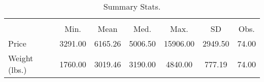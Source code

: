 \begin{table}[htbp]\centering
\def\sym#1{\ifmmode^{#1}\else\(^{#1}\)\fi}
\caption{Summary Stats.}
\begin{tabular}{l*{1}{cccccc}}
\hline\hline
                    &\multicolumn{6}{c}{}                                                         \\
                    &        Min.&        Mean&        Med.&        Max.&          SD&        Obs.\\
\hline
Price               &     3291.00&     6165.26&     5006.50&    15906.00&     2949.50&       74.00\\
Weight (lbs.)       &     1760.00&     3019.46&     3190.00&     4840.00&      777.19&       74.00\\
\hline\hline
\end{tabular}
\end{table}
